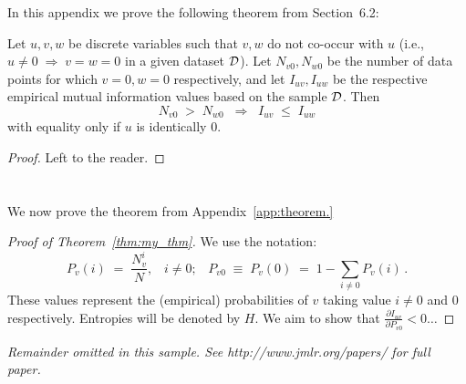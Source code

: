 \documentclass[twoside,11pt]{article}
\newcommand{\dataset}{{\cal D}}
\newcommand{\fracpartial}[2]{\frac{\partial #1}{\partial  #2}}
\begin{document}


In this appendix we prove the following theorem from
Section~6.2:

\begin{theorem}[discrete]\label{thm:my_thm}
	Let $u,v,w$ be discrete variables such that $v, w$ do
	not co-occur with $u$ (i.e., $u\neq0\;\Rightarrow \;v=w=0$ in a given
	dataset $\dataset$). Let $N_{v0},N_{w0}$ be the number of data points for
	which $v=0, w=0$ respectively, and let $I_{uv},I_{uw}$ be the
	respective empirical mutual information values based on the sample
	$\dataset$. Then
	\[
	N_{v0} \;>\; N_{w0}\;\;\Rightarrow\;\;I_{uv} \;\leq\;I_{uw}
	\]
	with equality only if $u$ is identically 0.
\end{theorem}

\begin{proof}
	Left to the reader.
\end{proof}

\section{}
We now prove the theorem from Appendix~\ref{app:theorem.}
\begin{proof}[Proof of Theorem~\ref{thm:my_thm}]
	We use the notation:
	\[
	P_v(i) \;=\;\frac{N_v^i}{N},\;\;\;i \neq 0;\;\;\;
	P_{v0}\;\equiv\;P_v(0)\; = \;1 - \sum_{i\neq 0}P_v(i)\,.
	\]
	These values represent the (empirical) probabilities of $v$
	taking value $i\neq 0$ and 0 respectively.  Entropies will be denoted
	by $H$. We aim to show that $\fracpartial{I_{uv}}{P_{v0}} < 0 \ldots$
\end{proof}

{\noindent \em Remainder omitted in this sample. See http://www.jmlr.org/papers/ for full paper.}


\vskip 0.2in

\end{document}

